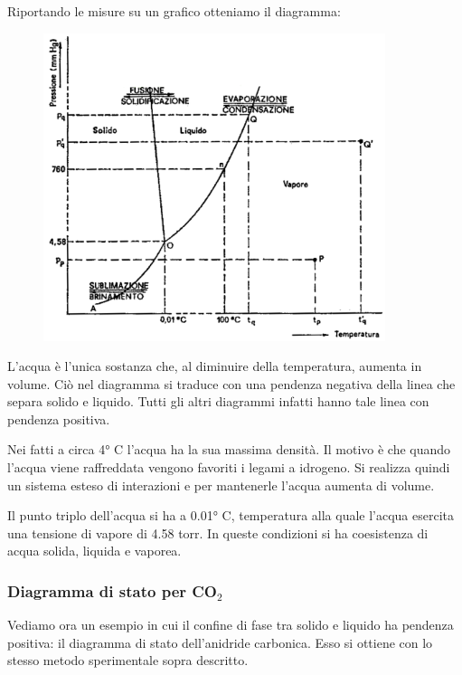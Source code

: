 Riportando le misure su un grafico otteniamo il diagramma:

\begin{figure}[htp]
    \centering
    \includegraphics[width=10cm]{immagini/diagramma_di_stato_acqua.png}
\end{figure}

L'acqua è l'unica sostanza che, al diminuire della temperatura, aumenta in volume. Ciò nel diagramma si traduce con una pendenza negativa della linea che separa solido e liquido. Tutti gli altri diagrammi infatti hanno tale linea con pendenza positiva.

Nei fatti a circa 4° C l'acqua ha la sua massima densità. Il motivo è che quando l'acqua viene raffreddata vengono favoriti i legami a idrogeno. Si realizza quindi un sistema esteso di interazioni e per mantenerle l'acqua aumenta di volume.

Il punto triplo dell'acqua si ha a 0.01° C, temperatura alla quale l'acqua esercita una tensione di vapore di 4.58 torr. In queste condizioni si ha coesistenza di acqua solida, liquida e vaporea.
\subsubsection{Diagramma di stato per CO$_2$}

Vediamo ora un esempio in cui il confine di fase tra solido e liquido ha pendenza positiva: il diagramma di stato dell'anidride carbonica. Esso si ottiene con lo stesso metodo sperimentale sopra descritto.

